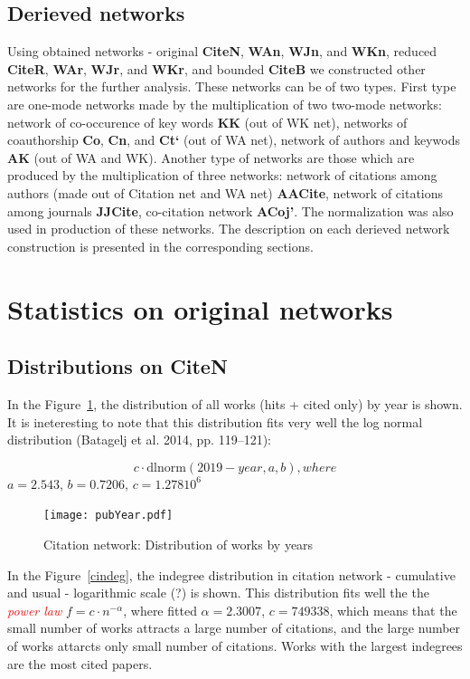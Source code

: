 \documentclass[11pt]{article} %
\newcommand{\keyw}[1]{\textcolor{red}{\emph{#1}}}
\begin{document}
\subsection{Derieved networks}

Using obtained networks - original \textbf{CiteN}, \textbf{WAn}, \textbf{WJn}, and \textbf{WKn}, reduced \textbf{CiteR}, \textbf{WAr}, \textbf{WJr}, and \textbf{WKr}, and bounded \textbf{CiteB} we constructed other networks for the further analysis. These networks can be of two types. First type are one-mode networks made by the multiplication of two two-mode networks: network of co-occurence of key words \textbf{KK} (out of WK net), networks of coauthorship \textbf{Co}, \textbf{Cn}, and \textbf{Ct`} (out of WA net), network of authors and keywods \textbf{AK} (out of WA and WK). Another type of networks are those which are produced by the multiplication of three networks: network of citations among authors (made out of Citation net and WA net) \textbf{AACite}, network of citations among journals \textbf{JJCite}, co-citation network \textbf{ACoj'}. The normalization was also used in production of these networks. The description on each derieved network construction is presented in the corresponding sections. 

\section{Statistics on original networks}

\normalsize
\subsection{Distributions on CiteN}

In the Figure~\ref{yeard}, the distribution of all works (hits + cited only) by year is shown. It is ineteresting to note that this distribution fits very well the log normal distribution (Batagelj et al. 2014, pp. 119–121): 

\[ c\cdot \mbox{dlnorm}(2019-year,a,b), where \]
$a = 2.543$,
$b = 0.7206$,
$c = 1.278 10^6$

\begin{figure}
\centerline{\texttt{[image: pubYear.pdf]}}
\caption{Citation network: Distribution of works by years}\label{yeard}
\end{figure}
\medskip   

In the Figure~\ref{cindeg}, the indegree distribution in citation network - cumulative and usual - logarithmic scale (?) is shown. This distribution fits well the the \keyw{power law} $f = c \cdot n^{-\alpha}$, where fitted $\alpha = 2.3007$, $c=749338$, which means that the small number of works   attracts a large number of citations, and the large number of works attarcts only small number of citations. Works with the largest indegrees are the most cited papers. 
\end{document}
